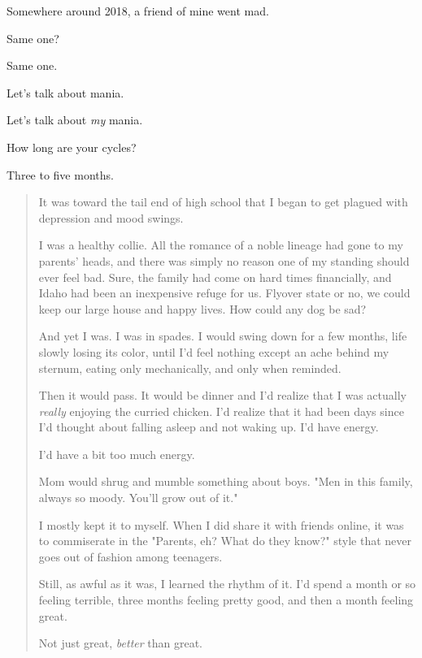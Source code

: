 \newpage


\noindent Somewhere around 2018, a friend of mine went mad.

\begin{ally}
Same one?
\end{ally}
Same one.

\begin{ally}
Let's talk about mania.
\end{ally}
Let's talk about \emph{my} mania.

\begin{ally}
How long are your cycles?
\end{ally}
Three to five months.

\begin{quotation}
    It was toward the tail end of high school that I began to get plagued with depression and mood swings.

I was a healthy collie. All the romance of a noble lineage had gone to my parents' heads, and there was simply no reason one of my standing should ever feel bad. Sure, the family had come on hard times financially, and Idaho had been an inexpensive refuge for us. Flyover state or no, we could keep our large house and happy lives. How could any dog be sad?

And yet I was. I was in spades. I would swing down for a few months, life slowly losing its color, until I'd feel nothing except an ache behind my sternum, eating only mechanically, and only when reminded.

Then it would pass. It would be dinner and I'd realize that I was actually \emph{really} enjoying the curried chicken. I'd realize that it had been days since I'd thought about falling asleep and not waking up. I'd have energy.

I'd have a bit too much energy.

Mom would shrug and mumble something about boys. "Men in this family, always so moody. You'll grow out of it."

I mostly kept it to myself. When I did share it with friends online, it was to commiserate in the "Parents, eh? What do they know?" style that never goes out of fashion among teenagers.

Still, as awful as it was, I learned the rhythm of it. I'd spend a month or so feeling terrible, three months feeling pretty good, and then a month feeling great.

Not just great, \emph{better} than great.


\end{quotation}
